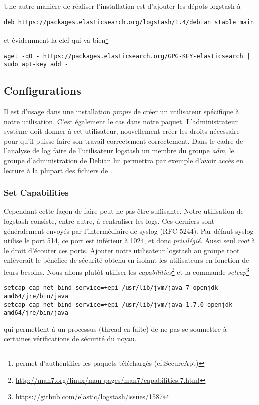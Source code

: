 Une autre manière de réaliser l'installation est d'ajouter les dépots logstash à 

\begin{lstlisting}[style=code,label={lst:ajoutdepotlogstash}]
deb https://packages.elasticsearch.org/logstash/1.4/debian stable main
\end{lstlisting}

et évidemment la clef qui va bien\footnote{permet d'authentifier les paquets téléchargés
(cf:SecureApt)}

\begin{lstlisting}[style=code,label={lst:ajoutclefdepotlogstash}]
wget -qO - https://packages.elasticsearch.org/GPG-KEY-elasticsearch | sudo apt-key add -
\end{lstlisting}

\subsection{Configurations}
Il est d'usage dans une installation \textit{propre} de créer un utilisateur spécifique
à notre utilisation. C'est également le cas dans notre paquet. L'administrateur 
système doit donner à cet utilisateur, nouvellement créer les droits nécessaire 
pour qu'il puisse faire son travail correctement correctement. Dans le cadre de 
l'analyse de log faire de l'utilisateur logstash un membre du groupe \emph{adm}, 
le groupe d'administration de Debian lui permettra par exemple d'avoir accès en 
lecture à la plupart des fichiers de .

\subsubsection{Set Capabilities}
Cependant cette façon de faire peut ne pas être suffisante.
Notre utilisation de logstash consiste, entre autre, à centraliser les \gls{logs}. 
Ces derniers sont généralement envoyés par l'intermédiaire de syslog (RFC 5244).
Par défaut syslog utilise le port 514, ce port est inférieur à 1024, et donc \textit{privilégié}.
Aussi seul \emph{root} à le droit d'écouter ces ports. Ajouter notre utilisateur 
logstash au groupe root enlèverait le bénéfice de sécurité obtenu en isolant les 
utilisateurs en fonction de leurs besoins. Nous allons plutôt utiliser les 
\emph{capabilities}\footnote{\url{http://man7.org/linux/man-pages/man7/capabilities.7.html}} 
et la commande \emph{setcap}\footnote{\url{https://github.com/elastic/logstash/issues/1587}}
\begin{lstlisting}[style=code,label={lst:setcapabilities}]
setcap cap_net_bind_service=+epi /usr/lib/jvm/java-7-openjdk-amd64/jre/bin/java
setcap cap_net_bind_service=+epi /usr/lib/jvm/java-1.7.0-openjdk-amd64/jre/bin/java
\end{lstlisting}
qui permettent à un processus (thread en faite) de ne pas se soumettre à certaines 
vérifications de sécurité du noyau.

